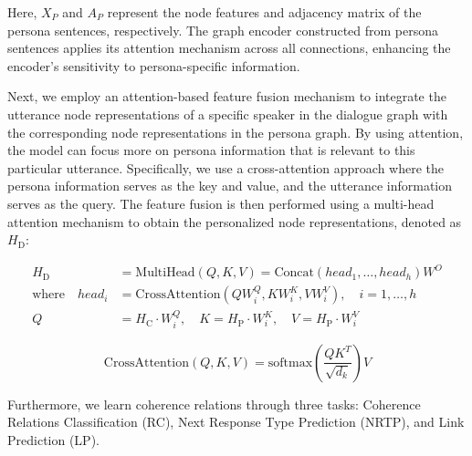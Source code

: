 Here, $X_{P}$ and $A_{P}$ represent the node features and adjacency matrix of the persona sentences, respectively. The graph encoder constructed from persona sentences applies its attention mechanism across all connections, enhancing the encoder's sensitivity to persona-specific information.

Next, we employ an attention-based feature fusion mechanism to integrate the utterance node representations of a specific speaker in the dialogue graph with the corresponding node representations in the persona graph. By using attention, the model can focus more on persona information that is relevant to this particular utterance. Specifically, we use a cross-attention approach where the persona information serves as the key and value, and the utterance information serves as the query. The feature fusion is then performed using a multi-head attention mechanism to obtain the personalized node representations, denoted as $H_{\text{D}}$:

\begin{equation}
\begin{aligned}
    H_{\text{D}} &= \text{MultiHead}(Q,K,V) = \text{Concat}(head_1, \ldots, head_h)W^O \\
    \text{where} \quad head_i &= \text{CrossAttention}(Q W^Q_i, K W^K_i, V W^V_i), \quad i = 1, \ldots, h \\
    Q &= H_{\text{C}} \cdot W^Q_i, \quad
    K = H_{\text{P}} \cdot W^K_i, \quad
    V = H_{\text{P}} \cdot W^V_i
\end{aligned}
\end{equation}

\begin{equation}
    \text{CrossAttention}(Q, K, V) = \text{softmax}\left(\frac{QK^T}{\sqrt{d_k}}\right)V
\end{equation}

Furthermore, we learn coherence relations through three tasks: Coherence Relations Classification (RC), Next Response Type Prediction (NRTP), and Link Prediction (LP).

